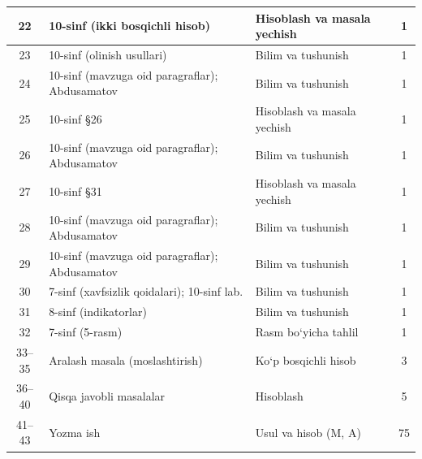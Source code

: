\documentclass[11pt,a4paper]{article}
\begin{document}
{\begin{longtable}{|c|p{7.2cm}|p{5.4cm}|c|}
22 & 10-sinf (ikki bosqichli hisob) & Hisoblash va masala yechish & 1\\\hline
23 & 10-sinf (olinish usullari) & Bilim va tushunish & 1\\\hline
24 & 10-sinf (mavzuga oid paragraflar); Abdusamatov & Bilim va tushunish & 1\\\hline
25 & 10-sinf \S{}26 & Hisoblash va masala yechish & 1\\\hline
26 & 10-sinf (mavzuga oid paragraflar); Abdusamatov & Bilim va tushunish & 1\\\hline
27 & 10-sinf \S{}31 & Hisoblash va masala yechish & 1\\\hline
28 & 10-sinf (mavzuga oid paragraflar); Abdusamatov & Bilim va tushunish & 1\\\hline
29 & 10-sinf (mavzuga oid paragraflar); Abdusamatov & Bilim va tushunish & 1\\\hline
30 & 7-sinf (xavfsizlik qoidalari); 10-sinf lab. & Bilim va tushunish & 1\\\hline
31 & 8-sinf (indikatorlar) & Bilim va tushunish & 1\\\hline
32 & 7-sinf (5-rasm) & Rasm bo`yicha tahlil & 1\\\hline
33--35 & Aralash masala (moslashtirish) & Ko`p bosqichli hisob & 3\\\hline
36--40 & Qisqa javobli masalalar & Hisoblash & 5\\\hline
41--43 & Yozma ish & Usul va hisob (M, A) & 75\\\hline
\end{longtable}}
\end{document}
